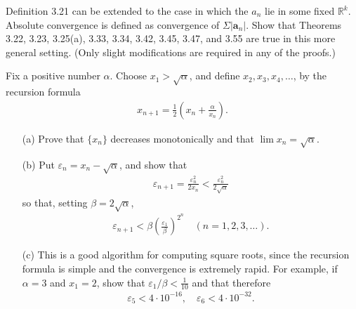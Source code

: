   \begin{solution}
    
  \end{solution}

  \begin{exercise}[Rudin 3.15]
    Definition 3.21 can be extended to the case in which the $a_n$ lie in some fixed $\mathbb{R}^k$. Absolute convergence is defined as convergence of $\Sigma |\mathbf{a}_n|$. Show that Theorems 3.22, 3.23, 3.25(a), 3.33, 3.34, 3.42, 3.45, 3.47, and 3.55 are true in this more general setting. (Only slight modifications are required in any of the proofs.)
  \end{exercise}
  \begin{solution}
    
  \end{solution}

  \begin{exercise}[Rudin 3.16]
    Fix a positive number $\alpha$. Choose $x_1 > \sqrt{\alpha}$, and define $x_2, x_3, x_4, \ldots$, by the recursion formula
    \begin{align*}
      x_{n+1} = \frac{1}{2}\left(x_n + \frac{\alpha}{x_n}\right).
    \end{align*}
    \begin{enumerate} 
      \item[(a)] Prove that $\{x_n\}$ decreases monotonically and that $\lim x_n = \sqrt{\alpha}$.
      \item[(b)] Put $\varepsilon_n = x_n - \sqrt{\alpha}$, and show that
      \begin{align*}
        \varepsilon_{n+1} = \frac{\varepsilon_n^2}{2x_n} < \frac{\varepsilon_n^2}{2\sqrt{\alpha}}
      \end{align*}
      so that, setting $\beta = 2\sqrt{\alpha}$,
      \begin{align*}
        \varepsilon_{n+1} < \beta \left(\frac{\varepsilon_1}{\beta}\right)^{2^n} \quad (n = 1, 2, 3, \ldots).
      \end{align*}
      \item[(c)] This is a good algorithm for computing square roots, since the recursion formula is simple and the convergence is extremely rapid. For example, if $\alpha = 3$ and $x_1 = 2$, show that $\varepsilon_1/\beta < \frac{1}{10}$ and that therefore
      \begin{align*}
        \varepsilon_5 < 4 \cdot 10^{-16}, \quad \varepsilon_6 < 4 \cdot 10^{-32}.
      \end{align*}
    \end{enumerate}
  \end{exercise}
  \begin{solution}
    
  \end{solution}

